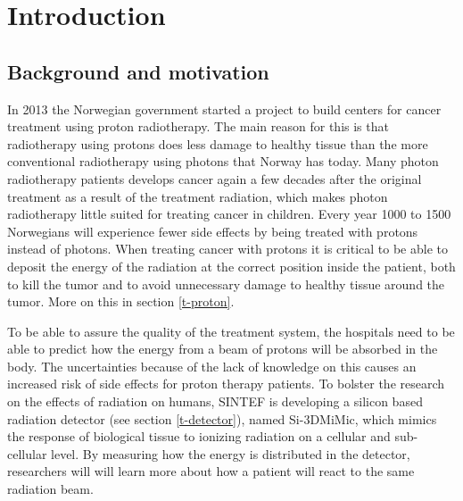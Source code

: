 \documentclass[../main/thesis.tex]{subfiles}
\begin{document}
\newpage

\chapter{Introduction}
\label{intro}
\section{Background and motivation}
\label{i-background}
In 2013 the Norwegian government started a project to build centers for cancer treatment using proton radiotherapy. The main reason for this is that radiotherapy using protons does less damage to healthy tissue than the more conventional radiotherapy using photons that Norway has today. Many photon radiotherapy patients develops cancer again a few decades after the original treatment as a result of the treatment radiation, which makes photon radiotherapy little suited for treating cancer in children. Every year 1000 to 1500 Norwegians will experience fewer side effects by being treated with protons instead of photons. \citep{uio2012} When treating cancer with protons it is critical to be able to deposit the energy of the radiation at the correct position inside the patient, both to kill the tumor and to avoid unnecessary damage to healthy tissue around the tumor. More on this in section \ref{t-proton}.


To be able to assure the quality of the treatment system, the hospitals need to be able to predict how the energy from a beam of protons will be absorbed in the body. The uncertainties because of the lack of knowledge on this causes an increased risk of side effects for proton therapy patients. To bolster the research on the effects of radiation on humans, SINTEF is developing a silicon based radiation detector (see section \ref{t-detector}), named Si-3DMiMic, which mimics the response of biological tissue to ionizing radiation on a cellular and sub-cellular level. By measuring how the energy is distributed in the detector, researchers will will learn more about how a patient will react to the same radiation beam. \citep{sintef3dmimic}
\end{document}
